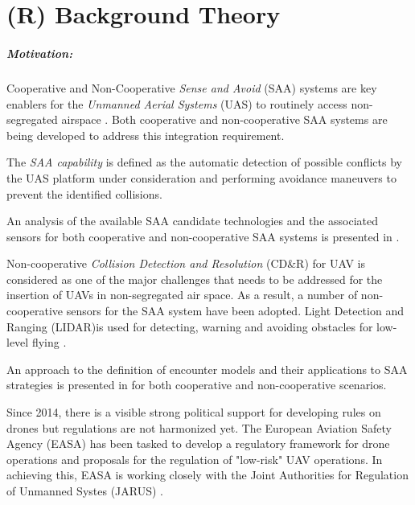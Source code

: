 \chapter{(R) Background Theory}\label{ch:backGroundTheory}

\paragraph{Motivation:} Cooperative and Non-Cooperative \emph{Sense and Avoid} (SAA) systems are key enablers for the \emph{Unmanned Aerial Systems} (UAS) to routinely access non-segregated airspace \cite{spriesterbach2013unmanned}. Both cooperative and non-cooperative SAA systems are being developed to address this integration requirement.

The \emph{SAA capability} is defined as the automatic detection of possible conflicts by the UAS platform under consideration and performing avoidance maneuvers to prevent the identified collisions.

An analysis of the available SAA candidate technologies and the associated sensors for both cooperative and non-cooperative SAA systems is presented in \cite{muraru2011critical}. 

Non-cooperative \emph{Collision Detection and Resolution} (CD\&R) for UAV is considered as one of the major challenges that needs to be addressed \cite{lai2012see} for the insertion of UAVs in non-segregated air space. As a result, a number of non-cooperative sensors for the SAA system have been adopted. Light Detection and Ranging (LIDAR)is used for detecting, warning and avoiding obstacles for low-level flying \cite{sabatini2014lidar}.

An approach to the definition of encounter models and their applications to SAA strategies is presented in \cite{kochenderfer2008encounter} for both cooperative and non-cooperative scenarios.

Since 2014, there is a visible strong political support for developing rules on drones but regulations are not harmonized yet. The European Aviation Safety Agency (EASA) has been tasked to develop a regulatory framework for drone operations and proposals for the regulation of "low-risk" UAV operations. In achieving this, EASA is working closely with the Joint Authorities for Regulation of Unmanned Systes (JARUS) \cite{jarus2016regulations}.

